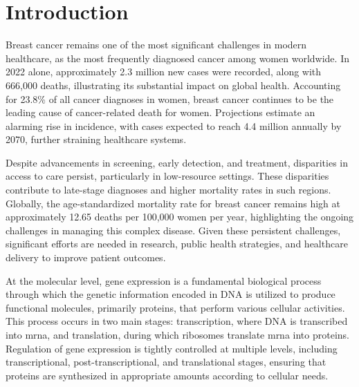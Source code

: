 \chapter{Introduction}

Breast cancer remains one of the most significant challenges in modern
healthcare, as the most frequently diagnosed cancer among women worldwide.
In 2022 alone, approximately 2.3 million new cases were recorded, along with
666,000 deaths, illustrating its substantial impact on global health.
Accounting for 23.8\% of all cancer diagnoses in
women\supercite{bray_global_2024,ferlay_global_2024}, breast cancer continues
to be the leading cause of cancer-related death for women.
Projections estimate an alarming rise in incidence, with cases expected to
reach 4.4 million annually by 2070, further straining healthcare
systems\supercite{lei_global_2021}.

Despite advancements in screening, early detection, and treatment, disparities
in access to care persist, particularly in low-resource settings.
These disparities contribute to late-stage diagnoses and higher mortality rates
in such regions\supercite{wilkinson_understanding_2022,ginsburg_breast_2020}.
Globally, the age-standardized mortality rate for breast cancer remains high at
approximately 12.65 deaths per 100,000 women per year, highlighting the ongoing
challenges in managing this complex
disease\supercite{bray_global_2024,ferlay_global_2024}.
Given these persistent challenges, significant efforts are needed in research,
public health strategies, and healthcare delivery to improve patient
outcomes\supercite{desantis_breast_2019}.

At the molecular level, gene expression is a fundamental biological process
through which the genetic information encoded in DNA is utilized to produce
functional molecules, primarily proteins, that perform various cellular
activities\supercite{salmena_cerna_2011}.
This process occurs in two main stages: transcription, where DNA is transcribed
into \gls{mrna}, and translation, during which ribosomes translate \gls{mrna}
into proteins\supercite{salmena_cerna_2011,tay_multilayered_2014}.
Regulation of gene expression is tightly controlled at multiple levels,
including transcriptional, post-transcriptional, and translational stages,
ensuring that proteins are synthesized in appropriate amounts according to
cellular
needs\supercite{poliseno_coding-independent_2010,tay_multilayered_2014}.

